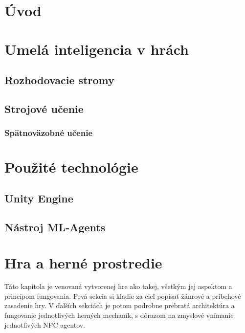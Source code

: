 \documentclass[slovak, master]{diploma}
\begin{document}
\MakeTitlePages

\listoffigures
\clearpage

\listoftables
\clearpage

\lstlistoflistings
\clearpage

\chapter{Úvod}
\label{sec:Introduction}


\chapter{Umelá inteligencia v hrách}
\label{sec:AI in games}

\section{Rozhodovacie stromy}
\label{sec:DecisionTreesOverview}

\section{Strojové učenie}
\label{sec:MachineLearningOverview}
\subsection{Spätnoväzobné učenie}
\label{sec:ReinforcemenLearningOverview}


\chapter{Použité technológie}
\label{sec:Tech}
\section{Unity Engine}
\label{sec:Unity}
\section{Nástroj ML-Agents}
\label{sec:ML-Agents}

\chapter{Hra a herné prostredie}
\label{sec:GameOverview}
Táto kapitola je venovaná vytvorenej hre ako takej, všetkým jej aspektom a princípom fungovania. Prvá sekcia si kladie za cieľ popísať žánrové a príbehové zasadenie hry. V ďalších sekciách je potom podrobne prebratá architektúra a fungovanie jednotlivých herných mechaník, s dôrazom na zmyslové vnímanie jednotlivých NPC agentov.
\end{document}
